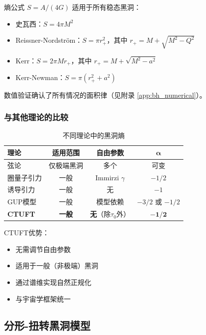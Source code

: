 \begin{theorem}[普适面积律]
熵公式 $S = A/(4G)$ 适用于所有稳态黑洞：
\begin{itemize}
    \item 史瓦西：$S = 4\pi M^2$
    \item Reissner-Nordström：$S = \pi r_+^2$，其中 $r_+ = M + \sqrt{M^2 - Q^2}$
    \item Kerr：$S = 2\pi M r_+$，其中 $r_+ = M + \sqrt{M^2 - a^2}$
    \item Kerr-Newman：$S = \pi(r_+^2 + a^2)$
\end{itemize}
\end{theorem}

数值验证确认了所有情况的面积律（见附录 \ref{app:bh_numerical}）。

\subsubsection{与其他理论的比较}

\begin{table}[h]
\centering
\caption{不同理论中的黑洞熵}
\begin{tabular}{lccc}
\toprule
\textbf{理论} & \textbf{适用范围} & \textbf{自由参数} & $\mathbf{\alpha}$ \\
\midrule
弦论 & 仅极端黑洞 & 多个 & 可变 \\
圈量子引力 & 一般 & Immirzi $\gamma$ & $-1/2$ \\
诱导引力 & 一般 & 无 & $-1$ \\
GUP模型 & 一般 & 模型依赖 & $-3/2$ 或 $-1/2$ \\
\textbf{CTUFT} & \textbf{一般} & \textbf{无}（除$\tau_0$外） & $\mathbf{-1/2}$ \\
\bottomrule
\end{tabular}
\end{table}

CTUFT优势：
\begin{itemize}
    \item 无需调节自由参数
    \item 适用于一般（非极端）黑洞
    \item 通过谱维实现自然正规化
    \item 与宇宙学框架统一
\end{itemize}

\subsection{分形-扭转黑洞模型}

